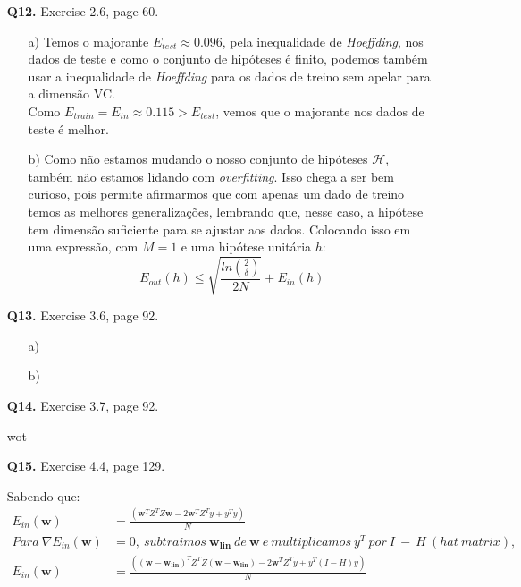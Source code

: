 \documentclass[12pt]{article}
\begin{document}
\begin{enumerate}
\item [\textbf{Q12.}] Exercise 2.6, page 60.
	\begin{addmargin}[1em]{2em}
		\begin{itemize}
			\item[a)] Temos o majorante $E_{test} \approx 0.096$, pela inequalidade de \textit{Hoeffding}, nos dados de teste e como o conjunto de hipóteses é finito, podemos também usar a inequalidade de \textit{Hoeffding} para os dados de treino sem apelar para a dimensão VC.\\
			Como $E_{train} = E_{in} \approx 0.115 > E_{test}$, vemos que o majorante nos dados de teste é melhor.
			\item[b)] Como não estamos mudando o nosso conjunto de hipóteses $\mathcal{H}$, também não estamos lidando com \textit{overfitting}. Isso chega a ser bem curioso, pois permite afirmarmos que com apenas um dado de treino temos as melhores generalizações, lembrando que, nesse caso, a  hipótese tem dimensão suficiente para se ajustar aos dados. Colocando isso em uma expressão, com $M = 1$ e uma hipótese unitária $h$: \[E_{out}(h) \leq \sqrt{\frac{ln \left( \frac{2}{\delta} \right)}{2N}} + E_{in}(h)\]
		\end{itemize}
	\end{addmargin}
\item [\textbf{Q13.}] Exercise 3.6, page 92.
	\begin{addmargin}[1em]{2em}
		\begin{itemize}
			\item[a)]
			\item[b)]
		\end{itemize}
	\end{addmargin}
\item [\textbf{Q14.}] Exercise 3.7, page 92.
	\begin{addmargin}[1em]{2em}
		wot
	\end{addmargin}
\item [\textbf{Q15.}] Exercise 4.4, page 129.
	\begin{addmargin}[1em]{2em}
		Sabendo que:
		\begin{align*}
			E_{in}(\mathbf{w}) & = \frac{(\mathbf{w}^TZ^TZ\mathbf{w} - 2 \mathbf{w}^TZ^Ty + y^Ty)}{N}\\
			Para\ \nabla E_{in}(\mathbf{w}) & = 0,\ subtraimos\ \mathbf{w_{lin}}\ de\ \mathbf{w}\ e\ multiplicamos\ y^T\ por\ I\ -\ H\ (hat\ matrix),\\
			E_{in}(\mathbf{w}) & = \frac{((\mathbf{w - w_{lin}})^TZ^TZ(\mathbf{w - w_{lin}}) - 2 \mathbf{w}^TZ^Ty + y^T(I - H)y)}{N}

\end{align*}
\end{addmargin}
\end{enumerate}
\end{document}
